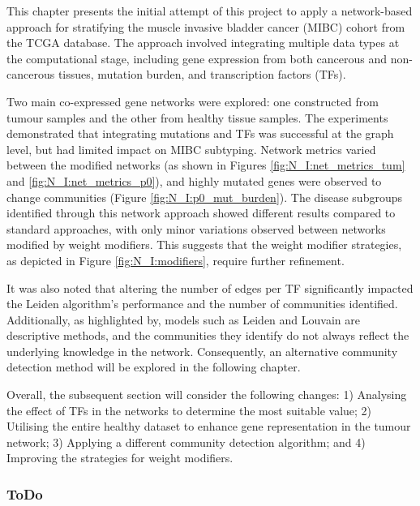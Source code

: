 This chapter presents the initial attempt of this project to apply a network-based approach for stratifying the muscle invasive bladder cancer (MIBC) cohort from the TCGA database. The approach involved integrating multiple data types at the computational stage, including gene expression from both cancerous and non-cancerous tissues, mutation burden, and transcription factors (TFs).

Two main co-expressed gene networks were explored: one constructed from tumour samples and the other from healthy tissue samples. The experiments demonstrated that integrating mutations and TFs was successful at the graph level, but had limited impact on MIBC subtyping. Network metrics varied between the modified networks (as shown in Figures \ref{fig:N_I:net_metrics_tum} and \ref{fig:N_I:net_metrics_p0}), and highly mutated genes were observed to change communities (Figure \ref{fig:N_I:p0_mut_burden}). The disease subgroups identified through this network approach showed different results compared to standard approaches, with only minor variations observed between networks modified by weight modifiers. This suggests that the weight modifier strategies, as depicted in Figure \ref{fig:N_I:modifiers}, require further refinement.

It was also noted that altering the number of edges per TF significantly impacted the Leiden algorithm's performance and the number of communities identified. Additionally, as highlighted by\citet{Peixoto2021-jx, Peixoto2023-rt}, models such as Leiden and Louvain are descriptive methods, and the communities they identify do not always reflect the underlying knowledge in the network. Consequently, an alternative community detection method will be explored in the following chapter.

Overall, the subsequent section will consider the following changes: 1) Analysing the effect of TFs in the networks to determine the most suitable value; 2) Utilising the entire healthy dataset to enhance gene representation in the tumour network; 3) Applying a different community detection algorithm; and 4) Improving the strategies for weight modifiers.

\newpage

\subsubsection{ToDo}

